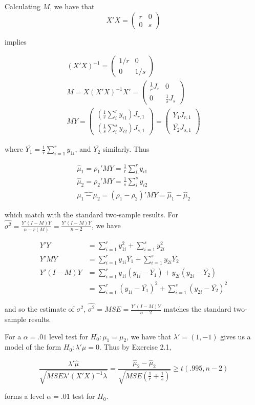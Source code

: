 \documentclass{article}
\begin{document}
Calculating $M$, we have that
\[
X'X = \begin{pmatrix}
r & 0 \\
0 & s \end{pmatrix}
\]

implies

\begin{gather*}
(X'X)^{-1} = \begin{pmatrix}
1/r & 0 \\
0 & 1/s \end{pmatrix} \\
M = X(X'X)^{-1}X' = \begin{pmatrix}
\frac{1}{r} J_{r} & 0 \\
0 & \frac{1}{s} J_{s}
\end{pmatrix} \\
MY = \begin{pmatrix}
\left(\frac{1}{r}\sum_i^r y_{i1}\right)J_{r,1} \\
\left(\frac{1}{s}\sum_i^s y_{i2}\right)J_{s,1}
\end{pmatrix} = 
\begin{pmatrix}
\bar{Y_1}J_{r,1} \\
\bar{Y_2}J_{s,1}
\end{pmatrix}
\end{gather*}

where $\bar{Y_1} = \frac{1}{r}\sum_{i=1}^r y_{1i}$, and $\bar{Y_2}$ similarly. Thus

\begin{gather}
\hat{\mu}_1 = \rho_1'MY = \frac{1}{r}\sum_i^r y_{i1} \\
\hat{\mu}_2 = \rho_2'MY = \frac{1}{s}\sum_i^s y_{i2} \\
\widehat{\mu_1-\mu_2} = (\rho_1-\rho_2)'MY = \hat{\mu}_1 - \hat{\mu}_2
\end{gather}

which match with the standard two-sample results. For $\hat{\sigma^2} = \frac{Y'(I-M)Y}{n-r(M)} = \frac{Y'(I-M)Y}{n-2}$, we have

\begin{align*}
Y'Y &= \sum_{i=1}^r y_{1i}^2 + \sum_{i=1}^s y_{2i}^2 \\
Y'MY &= \sum_{i=1}^r y_{1i}\bar{Y_1} + \sum_{i=1}^s y_{2i}\bar{Y_2} \\
Y'(I-M)Y &= \sum_{i=1}^r y_{1i}(y_{1i}-\bar{Y_1}) + y_{2i}(y_{2i}-\bar{Y_2})  \\
&= \sum_{i=1}^r (y_{1i}-\bar{Y_1})^2 + \sum_{i=1}^s (y_{2i}-\bar{Y_2})^2
\end{align*}

and so the estimate of $\sigma^2$, $\hat{\sigma^2} =MSE = \frac{Y'(I-M)Y}{n-2}$ matches the standard two-sample results.

For a $\alpha=.01$ level test for $H_0:\mu_1 = \mu_2$, we have that $\lambda'=(1, -1)$ gives us a model of the form $H_0: \lambda'\mu = 0$. Thus by Exercise 2.1,

\[
\frac{
\lambda'\hat{\mu}
}{
\sqrt{
MSE \lambda'(X'X)^{-1}\lambda
}
} =
\frac{
\hat{\mu}_2 - \hat{\mu}_2
}{
\sqrt{
MSE (\frac{1}{r} + \frac{1}{s})
}
}
\geq t(.995, n-2)
\]

forms a level $\alpha=.01$ test for $H_0$.
\end{document}
